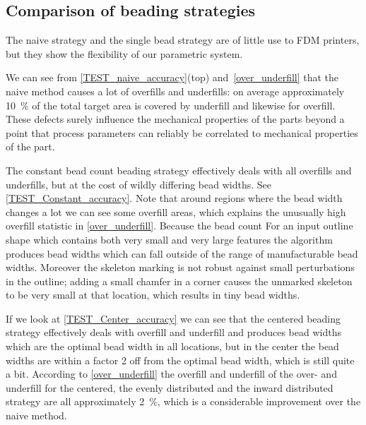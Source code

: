 


\subsection{Comparison of beading strategies}
The naive strategy and the single bead strategy are of little use to FDM printers, but they show the flexibility of our parametric system.

We can see from \cref{TEST_naive_accuracy}(top) and~\ref{over_underfill} that the naive method causes a lot of overfills and underfills: on average approximately \SI{10}{\percent} of the total target area is covered by underfill and likewise for overfill.
These defects surely influence the mechanical properties of the parts beyond a point that process parameters can reliably be correlated to mechanical properties of the part.


The constant bead count beading strategy effectively deals with all overfills and underfills, but at the cost of wildly differing bead widths.
See \cref{TEST_Constant_accuracy}.
Note that around regions where the bead width changes a lot we can see some overfill areas, which explains the unusually high overfill statistic in \cref{over_underfill}.
Because the bead count 
For an input outline shape which contains both very small and very large features the algorithm produces bead widths which can fall outside of the range of manufacturable bead widths.
Moreover the skeleton marking is not robust against small perturbations in the outline; adding a small chamfer in a corner causes the unmarked skeleton to be very small at that location, which results in tiny bead widths.

If we look at \cref{TEST_Center_accuracy} we can see that
the centered beading strategy effectively deals with overfill and underfill and produces bead widths which are the optimal bead width in all locations, but in the center the bead widths are within a factor 2 off from the optimal bead width, which is still quite a bit.
According to \cref{over_underfill} the overfill and underfill of the over- and underfill for the centered, the evenly distributed and the inward distributed strategy are all approximately \SI{2}{\percent}, which is a considerable improvement over the naive method.

